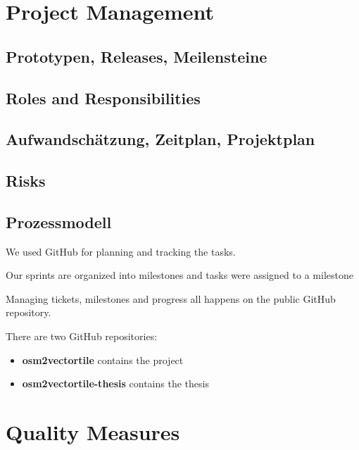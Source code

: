 \chapter{Project Management}\label{project-management}


\section{Prototypen, Releases, Meilensteine}

\section{Roles and Responsibilities}\label{roles-and-responsibilities}

\section{Aufwandschätzung, Zeitplan, Projektplan}

\section{Risks}\label{risks}

\section{Prozessmodell}

We used GitHub for planning and tracking the tasks.

Our sprints are organized into milestones and tasks were assigned to a milestone

Managing tickets, milestones and progress all happens on the public
GitHub repository.



There are two GitHub repositories:

\begin{itemize}
\item
  \textbf{osm2vectortile} contains the project
\item
  \textbf{osm2vectortile-thesis} contains the thesis
\end{itemize}

\newpage
\chapter{Quality Measures}\label{quality-measures}

